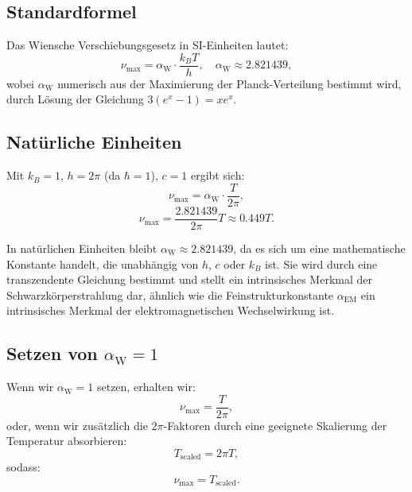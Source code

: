 \documentclass[12pt,a4paper]{article}
\newcommand{\alphaEM}{\alpha_{\text{EM}}}
\newcommand{\alphaW}{\alpha_{\text{W}}}
\begin{document}
	\subsection{Standardformel}
	
	Das Wiensche Verschiebungsgesetz in SI-Einheiten lautet:
	\[
	\nu_{\text{max}} = \alphaW \cdot \frac{k_B T}{h}, \quad \alphaW \approx 2.821439,
	\]
	wobei \(\alphaW\) numerisch aus der Maximierung der Planck-Verteilung bestimmt wird, durch Lösung der Gleichung \(3 (e^x - 1) = x e^x\).
	
	\subsection{Natürliche Einheiten}
	
	Mit \(k_B = 1\), \(h = 2\pi\) (da \(\hbar = 1\)), \(c = 1\) ergibt sich:
	\[
	\nu_{\text{max}} = \alphaW \cdot \frac{T}{2\pi},
	\]
	\[
	\nu_{\text{max}} = \frac{2.821439}{2\pi} T \approx 0.449 T.
	\]
	
	In natürlichen Einheiten bleibt \(\alphaW \approx 2.821439\), da es sich um eine mathematische Konstante handelt, die unabhängig von \(h\), \(c\) oder \(k_B\) ist. Sie wird durch eine transzendente Gleichung bestimmt und stellt ein intrinsisches Merkmal der Schwarzkörperstrahlung dar, ähnlich wie die Feinstrukturkonstante \(\alphaEM\) ein intrinsisches Merkmal der elektromagnetischen Wechselwirkung ist.
	
	\subsection{Setzen von \(\alphaW = 1\)}
	
	Wenn wir \(\alphaW = 1\) setzen, erhalten wir:
	\[
	\nu_{\text{max}} = \frac{T}{2\pi},
	\]
	oder, wenn wir zusätzlich die \(2\pi\)-Faktoren durch eine geeignete Skalierung der Temperatur absorbieren:
	\[
	T_{\text{scaled}} = 2\pi T,
	\]
	sodass:
	\[
	\nu_{\text{max}} = T_{\text{scaled}}.
	\]
	
\end{document}
